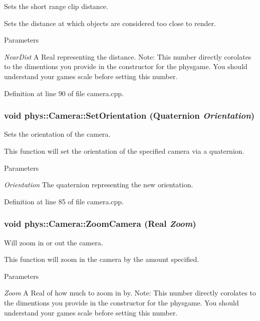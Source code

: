 Sets the short range clip distance. 

Sets the distance at which objects are considered too close to render. 
\begin{DoxyParams}{Parameters}
\item[{\em NearDist}]A Real representing the distance. Note: This number directly corolates to the dimentions you provide in the constructor for the physgame. You should understand your games scale before setting this number. \end{DoxyParams}


Definition at line 90 of file camera.cpp.

\hypertarget{classphys_1_1Camera_af0822410414622c2a3c8b4da207b53ab}{
\subsubsection[{SetOrientation}]{\setlength{\rightskip}{0pt plus 5cm}void phys::Camera::SetOrientation ({\bf Quaternion} {\em Orientation})}}
\label{d9/df8/classphys_1_1Camera_af0822410414622c2a3c8b4da207b53ab}


Sets the orientation of the camera. 

This function will set the orientation of the specified camera via a quaternion. 
\begin{DoxyParams}{Parameters}
\item[{\em Orientation}]The quaternion representing the new orientation. \end{DoxyParams}


Definition at line 85 of file camera.cpp.

\hypertarget{classphys_1_1Camera_a1cb593d12be4e6e1e51cb8f74ce2d97c}{
\subsubsection[{ZoomCamera}]{\setlength{\rightskip}{0pt plus 5cm}void phys::Camera::ZoomCamera ({\bf Real} {\em Zoom})}}
\label{d9/df8/classphys_1_1Camera_a1cb593d12be4e6e1e51cb8f74ce2d97c}


Will zoom in or out the camera. 

This function will zoom in the camera by the amount specified. 
\begin{DoxyParams}{Parameters}
\item[{\em Zoom}]A Real of how much to zoom in by. Note: This number directly corolates to the dimentions you provide in the constructor for the physgame. You should understand your games scale before setting this number. \end{DoxyParams}


